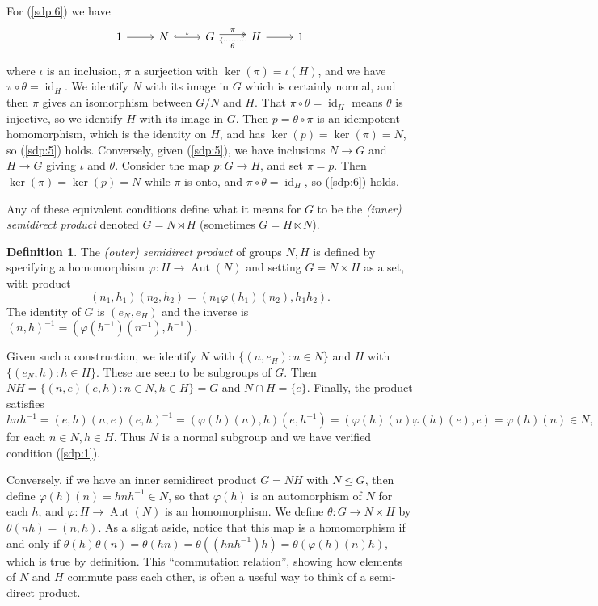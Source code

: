 \documentclass[twoside,a4paper,12pt]{article}
\theoremstyle{plain}
\theoremstyle{definition}
\newtheorem{definition}[proposition]{Definition}
\newcommand{\id}{\operatorname{id}}
\newcommand{\aut}{\operatorname{Aut}}
\begin{document}
For (\ref{sdp:6}) we have
\begin{equation}
\begin{tikzcd}
1 \arrow[r] &
N \arrow[r, hook, "\iota"] &
G \arrow[r, twoheadrightarrow, shift left=0.6ex, "\pi"] &
H \arrow[r] \arrow[l, dotted, shift left=0.6ex, "\theta"] & 1
\end{tikzcd}
\label{eq:sdp:1}
\end{equation}

where $\iota$ is an inclusion, $\pi$ a surjection with $\ker(\pi) = \iota(H)$, and we have
$\pi\circ\theta = \id_H$.  We identify $N$ with its image in $G$ which is certainly normal, and then
$\pi$ gives an isomorphism between $G/N$ and $H$.  That $\pi\circ\theta=\id_H$ means $\theta$ is injective,
so we identify $H$ with its image in $G$.  Then $p = \theta\circ\pi$ is an idempotent homomorphism,
which is the identity on $H$, and has $\ker(p) = \ker(\pi) = N$, so (\ref{sdp:5}) holds.
Conversely, given (\ref{sdp:5}), we have inclusions $N\rightarrow G$ and $H\rightarrow G$ giving
$\iota$ and $\theta$.  Consider the map $p:G\rightarrow H$, and set $\pi=p$.  Then $\ker(\pi) = \ker(p)
= N$ while $\pi$ is onto, and $\pi\circ\theta = \id_H$, so (\ref{sdp:6}) holds.

Any of these equivalent conditions define what it means for $G$ to be the \emph{(inner) semidirect
product} denoted $G = N \rtimes H$ (sometimes $G = H \ltimes N$).

\begin{definition}
The \emph{(outer) semidirect product} of groups $N,H$ is defined by specifying a homomorphism
$\varphi:H\rightarrow \aut(N)$ and setting $G = N\times H$ as a set, with product
\[ (n_1,h_1)(n_2,h_2) = (n_1 \varphi(h_1)(n_2), h_1h_2). \]
The identity of $G$ is $(e_N, e_H)$ and the inverse is $(n,h)^{-1} = (\varphi(h^{-1})(n^{-1}), h^{-1})$.
\end{definition}

Given such a construction, we identify $N$ with $\{ (n,e_H) : n\in N \}$ and $H$ with $\{ (e_N,h):h\in H\}$.
These are seen to be subgroups of $G$.  Then $NH = \{ (n,e)(e,h) : n\in N, h\in H \} = G$ and $N\cap H=\{e\}$.
Finally, the product satisfies
\[ h n h^{-1} = (e,h)(n,e)(e,h)^{-1}
= (\varphi(h)(n), h) (e,h^{-1})
= (\varphi(h)(n) \varphi(h)(e), e) = \varphi(h)(n) \in N, \]
for each $n\in N, h\in H$.  Thus $N$ is a normal subgroup and we have verified condition (\ref{sdp:1}).

Conversely, if we have an inner semidirect product $G=NH$ with $N \unlhd G$, then define $\varphi(h)(n)
= hnh^{-1} \in N$, so that $\varphi(h)$ is an automorphism of $N$ for each $h$, and $\varphi:H\rightarrow
\aut(N)$ is an homomorphism.  We define $\theta: G \rightarrow N \times H$ by $\theta(nh) =
(n,h)$.  As a slight aside, notice that this map is a homomorphism if and only if $\theta(h) \theta(n) =
\theta(hn) = \theta( (hnh^{-1}) h ) = \theta( \varphi(h)(n) h )$, which is true by definition.
This ``commutation relation'', showing how elements of $N$ and $H$ commute pass each other, is often
a useful way to think of a semi-direct product.
\end{document}
